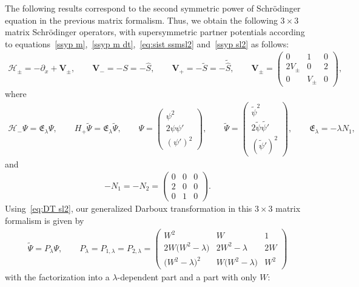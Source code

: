\documentclass[pdftex]{sigma}%
\numberwithin{equation}{section}
\begin{document}
The following results correspond to the second symmetric power of Schr\"odinger equation in the previous matrix formalism. Thus, we obtain the following $3\times 3$ matrix Schr\"odinger operators, with supersymmetric partner potentials according to equations~\eqref{ssyp m},~\eqref{ssyp m dt},~\eqref{eq:sist ssmsl2} and~\eqref{ssyp sl2} as follows:
\begin{gather*}
\mathcal H_\pm=-\partial_x+\mathbf{V}_\pm,\qquad \mathbf{V}_-=-S=-\widehat{S},\qquad \mathbf{V}_+=-\widetilde{S}=-\widetilde{\widehat{S}},\qquad \mathbf{V}_{\pm} =\begin{pmatrix}0&1&0\\2V_{\pm}&0&2\\0&V_\pm&0\end{pmatrix}\!,
\end{gather*}
where
\begin{gather*}
\mathcal H_-\Psi=\mathfrak{E}_{\lambda} \Psi,\qquad
H_+\widetilde{\Psi}=\mathfrak{E}_{\lambda} \widetilde{\Psi}, \qquad
\Psi=\begin{pmatrix} \psi^2\\2\psi\psi'\\(\psi')^2\end{pmatrix}\!,\qquad \widetilde{\Psi}=\begin{pmatrix} \widetilde{\psi}^2\\2\widetilde{\psi}\widetilde{\psi'}\\(\widetilde{\psi}')^2\end{pmatrix}\!,\qquad \mathfrak{E}_{\lambda}=-\lambda N_1,
\end{gather*}
and
\begin{gather*}
-N_1=-N_2=\begin{pmatrix}0&0&0\\2&0&0\\0&1&0\end{pmatrix}\!.
\end{gather*}
Using~\eqref{eq:DT sl2}, our generalized Darboux transformation in this $3\times 3$ matrix formalism is given by
\begin{gather*}
\widetilde{\Psi}=P_\lambda\Psi,\qquad P_\lambda=P_{1,\lambda}=P_{2,\lambda}=\begin{pmatrix}
W^2&W&1\\ 2W\big(W^2-\lambda\big)&2W^2-\lambda&2W\\ \big(W^2-\lambda\big)^2&W\big(W^2-\lambda\big)&W^2
\end{pmatrix}
\end{gather*}
with the factorization into a $\lambda$-dependent part and a part with only $W$:
\end{document}
